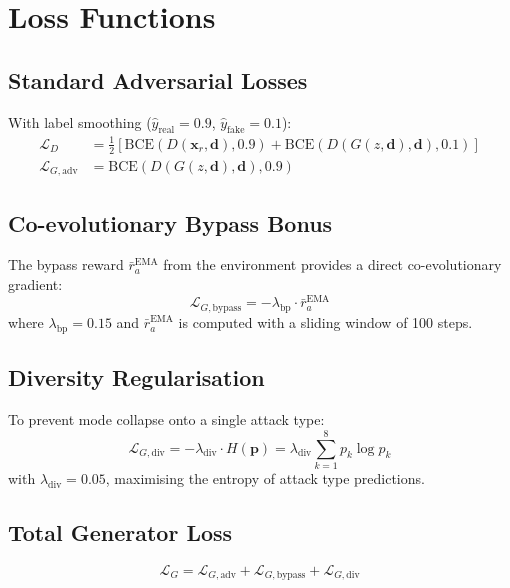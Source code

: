 \section{Loss Functions}

\subsection{Standard Adversarial Losses}
With label smoothing ($\hat{y}_{\mathrm{real}} = 0.9$,
$\hat{y}_{\mathrm{fake}} = 0.1$):
\begin{align}
  \mathcal{L}_D &= \tfrac{1}{2}\left[\mathrm{BCE}(D(\mathbf{x}_r,\mathbf{d}),
    0.9) + \mathrm{BCE}(D(G(z,\mathbf{d}),\mathbf{d}), 0.1)\right] \\
  \mathcal{L}_{G,\mathrm{adv}} &= \mathrm{BCE}(D(G(z,\mathbf{d}),\mathbf{d}), 0.9)
\end{align}

\subsection{Co-evolutionary Bypass Bonus}
The bypass reward $\bar r_a^{\mathrm{EMA}}$ from the environment
provides a direct co-evolutionary gradient:
\begin{equation}
  \mathcal{L}_{G,\mathrm{bypass}} = -\lambda_{\mathrm{bp}} \cdot \bar r_a^{\mathrm{EMA}}
\end{equation}
where $\lambda_{\mathrm{bp}} = 0.15$ and $\bar r_a^{\mathrm{EMA}}$ is
computed with a sliding window of 100 steps.

\subsection{Diversity Regularisation}
To prevent mode collapse onto a single attack type:
\begin{equation}
  \mathcal{L}_{G,\mathrm{div}} = -\lambda_{\mathrm{div}} \cdot H(\mathbf{p})
  = \lambda_{\mathrm{div}} \sum_{k=1}^8 p_k \log p_k
\end{equation}
with $\lambda_{\mathrm{div}} = 0.05$, maximising the entropy of attack
type predictions.

\subsection{Total Generator Loss}
\begin{equation}
  \mathcal{L}_G = \mathcal{L}_{G,\mathrm{adv}}
    + \mathcal{L}_{G,\mathrm{bypass}}
    + \mathcal{L}_{G,\mathrm{div}}
  \label{eq:g_loss}
\end{equation}

